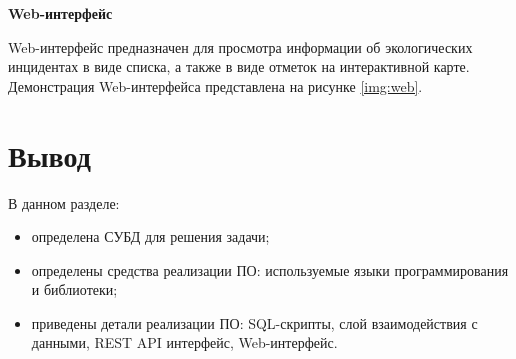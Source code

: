 \noindent\textbf{Web-интерфейс}

Web-интерфейс предназначен для просмотра информации об экологических инцидентах в виде списка, а также в виде отметок на интерактивной карте. Демонстрация Web-интерфейса представлена на рисунке \ref{img:web}.

\section*{Вывод}
В данном разделе:
\begin{itemize}
	\item определена СУБД для решения задачи;
	\item определены средства реализации ПО: используемые языки программирования и библиотеки;
	\item приведены детали реализации ПО: SQL-скрипты, слой взаимодействия с данными, REST API интерфейс, Web-интерфейс.
\end{itemize}

